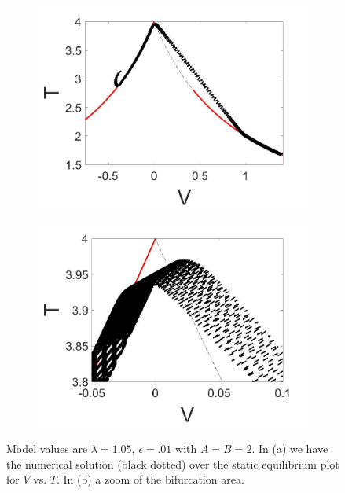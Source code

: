 \begin{figure}[H]
\centering
\begin{subfigure}{.5\textwidth}
 \centering
 \includegraphics[width=\linewidth]{twoD/slowosc_Tplot_medium.jpg}
 \caption{}
\end{subfigure}%
\begin{subfigure}{.5\textwidth}
 \centering
 \includegraphics[width=\linewidth]{twoD/slowosc_Tplot_medium_zoom.jpg}
 \caption{}
\end{subfigure}
\caption{Model values are $\lambda=1.05$, $\epsilon=.01$ with $A=B=2$. In (a) we have the numerical solution (black dotted) over the static equilibrium plot for $V$ vs. $T$. In (b) a zoom of the bifurcation area.}
\label{fig:twoD_slowosc_Tnumerics_medium}
\end{figure}

